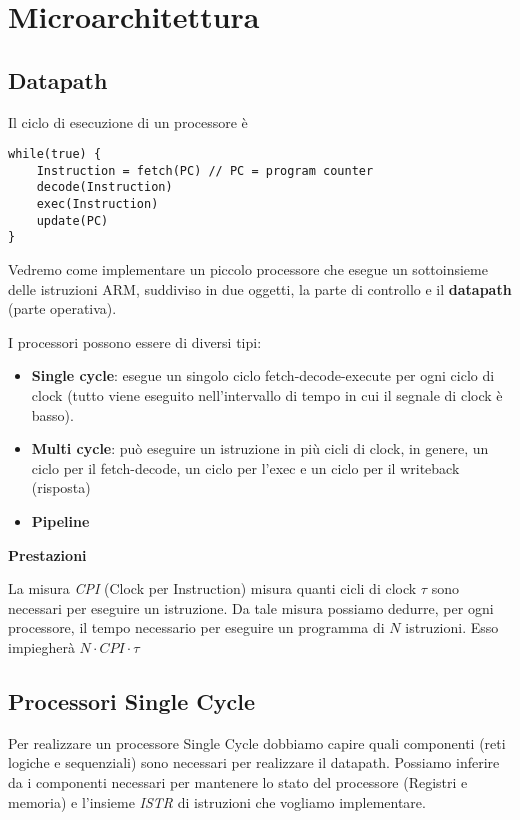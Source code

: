 \chapter{Microarchitettura}

\section{Datapath}

Il ciclo di esecuzione di un processore è

\begin{lstlisting}[frame=single]
while(true) {
    Instruction = fetch(PC) // PC = program counter
    decode(Instruction)
    exec(Instruction)
    update(PC)
}
\end{lstlisting}

Vedremo come implementare un piccolo processore che esegue un sottoinsieme delle
istruzioni ARM, suddiviso in due oggetti, la parte di controllo e il
\textbf{datapath} (parte operativa).

I processori possono essere di diversi tipi:
\begin{itemize}
    \item \textbf{Single cycle}: esegue un singolo ciclo fetch-decode-execute
    per ogni ciclo di clock (tutto viene eseguito nell'intervallo di tempo in
    cui il segnale di clock è basso).
    \item \textbf{Multi cycle}: può eseguire un istruzione in più cicli di
    clock, in genere, un ciclo per il fetch-decode, un ciclo per l'exec e un
    ciclo per il writeback (risposta)
    \item \textbf{Pipeline}
\end{itemize}

\begin{note}
    \textbf{Prestazioni}

    La misura \textit{CPI} (Clock per Instruction) misura quanti cicli di clock
    $\tau$ sono necessari per eseguire un istruzione. Da tale misura possiamo
    dedurre, per ogni processore, il tempo necessario per eseguire un programma
    di $N$ istruzioni. Esso impiegherà $N \cdot CPI \cdot \tau $
\end{note}


\section{Processori Single Cycle}

Per realizzare un processore Single Cycle dobbiamo capire quali componenti (reti
logiche e sequenziali) sono necessari per realizzare il datapath. Possiamo
inferire da i componenti necessari per mantenere lo stato del processore
(Registri e memoria) e l'insieme \textit{ISTR} di istruzioni che vogliamo
implementare.

